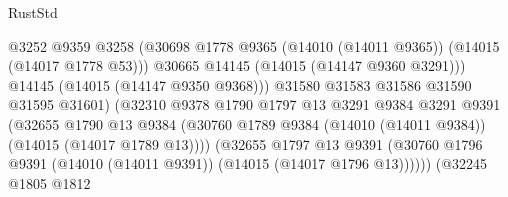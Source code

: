 \begin{lexlean}{RustStd}
\begin{coremodule}
                                              @3252
                                              @9359
                                              @3258
                                              (@30698
                                                @1778
                                                @9365
                                                (@14010 (@14011 @9365))
                                                (@14015 (@14017 @1778 @53)))
                                              @30665
                                              @14145
                                              (@14015 (@14147 @9360 @3291)))
                                            @14145
                                            (@14015 (@14147 @9350 @9368)))
                                          @31580
                                          @31583
                                          @31586
                                          @31590
                                          @31595
                                          @31601)
                                        (@32310
                                          @9378
                                          @1790
                                          @1797
                                          @13
                                          @3291
                                          @9384
                                          @3291
                                          @9391
                                          (@32655
                                            @1790
                                            @13
                                            @9384
                                            (@30760
                                              @1789
                                              @9384
                                              (@14010 (@14011 @9384))
                                              (@14015 (@14017 @1789 @13))))
                                          (@32655
                                            @1797
                                            @13
                                            @9391
                                            (@30760
                                              @1796
                                              @9391
                                              (@14010 (@14011 @9391))
                                              (@14015 (@14017 @1796 @13))))))
                                      (@32245
                                        @1805
                                        @1812

\end{coremodule}
\end{lexlean}
